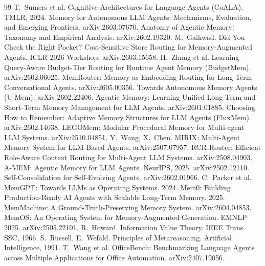 \documentclass[10pt,twocolumn]{article}
\begin{document}
\begin{thebibliography}{99}\small
{} T.~Sumers et al. Cognitive Architectures for Language Agents (CoALA). TMLR, 2024.
 Memory for Autonomous LLM Agents: Mechanisms, Evaluation, and Emerging Frontiers. arXiv:2603.07670.
 Anatomy of Agentic Memory: Taxonomy and Empirical Analysis. arXiv:2602.19320.
 M.~Gaikwad. Did You Check the Right Pocket? Cost-Sensitive Store Routing for Memory-Augmented Agents. ICLR 2026 Workshop. arXiv:2603.15658.
 H.~Zhang et al. Learning Query-Aware Budget-Tier Routing for Runtime Agent Memory (BudgetMem). arXiv:2602.06025.
 MemRouter: Memory-as-Embedding Routing for Long-Term Conversational Agents. arXiv:2605.00356.
 Towards Autonomous Memory Agents (U-Mem). arXiv:2602.22406.
 Agentic Memory: Learning Unified Long-Term and Short-Term Memory Management for LLM Agents. arXiv:2601.01885.
 Choosing How to Remember: Adaptive Memory Structures for LLM Agents (FluxMem). arXiv:2602.14038.
 LEGOMem: Modular Procedural Memory for Multi-agent LLM Systems. arXiv:2510.04851.
 Y.~Wang, X.~Chen. MIRIX: Multi-Agent Memory System for LLM-Based Agents. arXiv:2507.07957.
 RCR-Router: Efficient Role-Aware Context Routing for Multi-Agent LLM Systems. arXiv:2508.04903.
 A-MEM: Agentic Memory for LLM Agents. NeurIPS, 2025. arXiv:2502.12110.
 Self-Consolidation for Self-Evolving Agents. arXiv:2602.01966.
 C.~Packer et al. MemGPT: Towards LLMs as Operating Systems. 2024.
 Mem0: Building Production-Ready AI Agents with Scalable Long-Term Memory. 2025.
 MemMachine: A Ground-Truth-Preserving Memory System. arXiv:2604.04853.
 MemOS: An Operating System for Memory-Augmented Generation. EMNLP 2025. arXiv:2505.22101.
 R.~Howard. Information Value Theory. IEEE Trans. SSC, 1966.
 S.~Russell, E.~Wefald. Principles of Metareasoning. Artificial Intelligence, 1991.
 T.~Wang et al. OfficeBench: Benchmarking Language Agents across Multiple Applications for Office Automation. arXiv:2407.19056.
\end{thebibliography}
\end{document}
